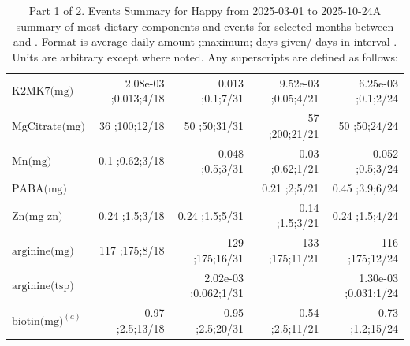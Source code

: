 \begin{table}[H]
\begin{tabular}{|l|r|r|r|r|}
$\textrm{K2MK7(mg)}$&2.08e-03 ;0.013;4/18&0.013 ;0.1;7/31&9.52e-03 ;0.05;4/21&6.25e-03 ;0.1;2/24\\
$\textrm{MgCitrate(mg)}$&36 ;100;12/18&50 ;50;31/31&57 ;200;21/21&50 ;50;24/24\\
$\textrm{Mn(mg)}$&0.1 ;0.62;3/18&0.048 ;0.5;3/31&0.03 ;0.62;1/21&0.052 ;0.5;3/24\\
$\textrm{PABA(mg)}$&&&0.21 ;2;5/21&0.45 ;3.9;6/24\\
$\textrm{Zn(mg~zn)}$&0.24 ;1.5;3/18&0.24 ;1.5;5/31&0.14 ;1.5;3/21&0.24 ;1.5;4/24\\
$\textrm{arginine(mg)}$&117 ;175;8/18&129 ;175;16/31&133 ;175;11/21&116 ;175;12/24\\
$\textrm{arginine(tsp)}$&&2.02e-03 ;0.062;1/31&&1.30e-03 ;0.031;1/24\\
$\textrm{biotin(mg)}^{\left(a\right)}$&0.97 ;2.5;13/18&0.95 ;2.5;20/31&0.54 ;2.5;11/21&0.73 ;1.2;15/24\\
\hline
\end{tabular}
\caption{Part 1 of 2.  Events Summary for Happy   from 2025-03-01 to 2025-10-24A summary of most dietary components and events  for selected months between \mjmdateminn and \mjmdatemaxn. Format is average daily amount ;maximum; days given/ days in interval . Units are arbitrary except where noted. Any  superscripts are defined as follows:  \mjmsuperscriptsn}
\end{table}
